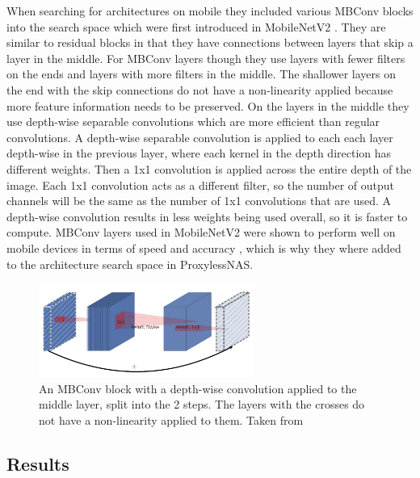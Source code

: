 \documentclass{ieee}
\begin{document}
When searching for architectures on mobile they included various MBConv blocks into the search space which were first introduced in MobileNetV2 \cite{sandler_howard_zhu_zhmoginov_chen_2018}. They are similar to residual blocks in that they have connections between layers that skip a layer in the middle. For MBConv layers though they use layers with fewer filters on the ends and layers with more filters in the middle. The shallower layers on the end with the skip connections do not have a non-linearity applied because more feature information needs to be preserved. On the layers in the middle they use depth-wise separable convolutions which are more efficient than regular convolutions. A depth-wise separable convolution is applied to each each layer depth-wise in the previous layer, where each kernel in the depth direction has different weights. Then a 1x1 convolution is applied across the entire depth of the image. Each 1x1 convolution acts as a different filter, so the number of output channels will be the same as the number of 1x1 convolutions that are used. A depth-wise convolution results in less weights being used overall, so it is faster to compute. \cite{separable_convolutions_2018} MBConv layers used in MobileNetV2 were shown to perform well on mobile devices in terms of speed and accuracy \cite{sandler_howard_zhu_zhmoginov_chen_2018}, which is why they where added to the architecture search space in ProxylessNAS.

\begin{figure}[h]
    \begin{center}
    \includegraphics[width=7cm]{images/mbconv.png}
    \end{center}
    \label{mbconv_fig}
    \caption{An MBConv block with a depth-wise convolution applied to the middle layer, split into the 2 steps. The layers with the crosses do not have a non-linearity applied to them. Taken from \cite{sandler_howard_zhu_zhmoginov_chen_2018}}
\end{figure}

\subsection{Results}
\end{document}
